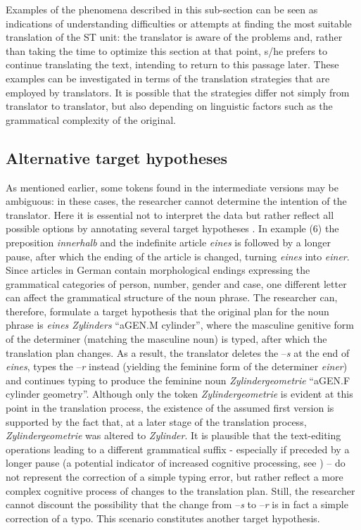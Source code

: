 \documentclass[output=paper]{LSP/langsci}
\begin{document}
Examples of the phenomena described in this sub-section can be seen as indications of understanding difficulties or attempts at finding the most suitable translation of the ST unit: the translator is aware of the problems and, rather than taking the time to optimize this section at that point, s/he prefers to continue translating the text, intending to return to this passage later. These examples can be investigated in terms of the translation strategies that are employed by translators. It is possible that the strategies differ not simply from translator to translator, but also depending on linguistic factors such as the grammatical complexity of the original.

\subsection{Alternative target hypotheses}
As mentioned earlier, some tokens found in the intermediate versions may be ambiguous: in these cases, the researcher cannot determine the intention of the translator. Here it is essential not to interpret the data but rather reflect all possible options by annotating several target hypotheses \citep{Lüdeling2008}. In example (6) the preposition \textit{innerhalb} and the indefinite article \textit{eines} is followed by a longer pause, after which the ending of the article is changed, turning \textit{eines} into \textit{einer}. Since articles in German contain morphological endings expressing the grammatical categories of person, number, gender and case, one different letter can affect the grammatical structure of the noun phrase. The researcher can, therefore, formulate a target hypothesis that the original plan for the noun phrase is \textit{eines Zylinders} “a{\tiny GEN.M} cylinder”, where the masculine genitive form of the determiner (matching the masculine noun) is typed, after which the translation plan changes. As a result, the translator deletes the –\textit{s} at the end of \textit{eines}, types the –\textit{r} instead (yielding the feminine form of the determiner \textit{einer}) and continues typing to produce the feminine noun \textit{Zylindergeometrie} “a{\tiny GEN.F} cylinder geometry”. Although only the token \textit{Zylindergeometrie} is evident at this point in the translation process, the existence of the assumed first version is supported by the fact that, at a later stage of the translation process, \textit{Zylindergeometrie} was altered to \textit{Zylinder}. It is plausible that the text-editing operations leading to a different grammatical suffix - especially if preceded by a longer pause (a potential indicator of increased cognitive processing, see \citealt{Dragsted2005}) – do not represent the correction of a simple typing error, but rather reflect a more complex cognitive process of changes to the translation plan. Still, the researcher cannot discount the possibility that the change from –\textit{s} to –\textit{r} is in fact a simple correction of a typo. This scenario constitutes another target hypothesis.
\end{document}
